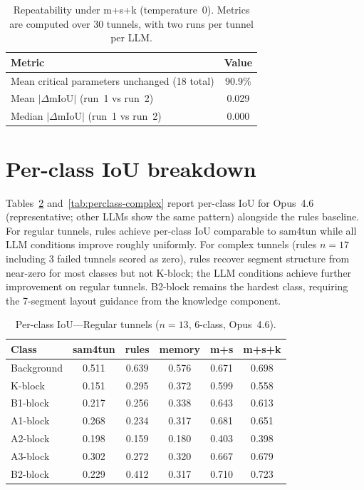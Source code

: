 \documentclass[a4paper,fleqn]{cas-dc}
\begin{document}
{\begin{table}[ht]
\caption{Repeatability under \mbox{m+s+k} (temperature~0). Metrics are computed over 30 tunnels, with two runs per tunnel per LLM.}\label{tab:repeatability}
\begin{tabular*}{\tblwidth}{@{} l c @{}}
\toprule
Metric & Value \\
\midrule
Mean critical parameters unchanged (18 total) & 90.9\% \\
Mean $\lvert\Delta\mathrm{mIoU}\rvert$ (run~1 vs run~2) & 0.029 \\
Median $\lvert\Delta\mathrm{mIoU}\rvert$ (run~1 vs run~2) & 0.000 \\
\bottomrule
\end{tabular*}
\end{table}

\FloatBarrier
\pagebreak[4]

\section{Per-class IoU breakdown}\label{app:perclass}

Tables~\ref{tab:perclass-regular} and~\ref{tab:perclass-complex} report per-class IoU for Opus~4.6 (representative; other LLMs show the same pattern) alongside the rules baseline. For regular tunnels, rules achieve per-class IoU comparable to sam4tun while all LLM conditions improve roughly uniformly. For complex tunnels (rules $n=17$ including 3 failed tunnels scored as zero), rules recover segment structure from near-zero for most classes but not K-block; the LLM conditions achieve further improvement on regular tunnels. B2-block remains the hardest class, requiring the 7-segment layout guidance from the knowledge component.

\begin{table}[ht]
\caption{Per-class IoU---Regular tunnels ($n=13$, 6-class, Opus~4.6).}\label{tab:perclass-regular}
\begin{tabular*}{\tblwidth}{@{} l c c c c c @{}}
\toprule
Class & sam4tun & rules & memory & m+s & m+s+k \\
\midrule
Background & 0.511 & 0.639 & 0.576 & 0.671 & 0.698 \\
K-block & 0.151 & 0.295 & 0.372 & 0.599 & 0.558 \\
B1-block & 0.217 & 0.256 & 0.338 & 0.643 & 0.613 \\
A1-block & 0.268 & 0.234 & 0.317 & 0.681 & 0.651 \\
A2-block & 0.198 & 0.159 & 0.180 & 0.403 & 0.398 \\
A3-block & 0.302 & 0.272 & 0.320 & 0.667 & 0.679 \\
B2-block & 0.229 & 0.412 & 0.317 & 0.710 & 0.723 \\
\bottomrule
\end{tabular*}
\end{table}

}
\end{document}
